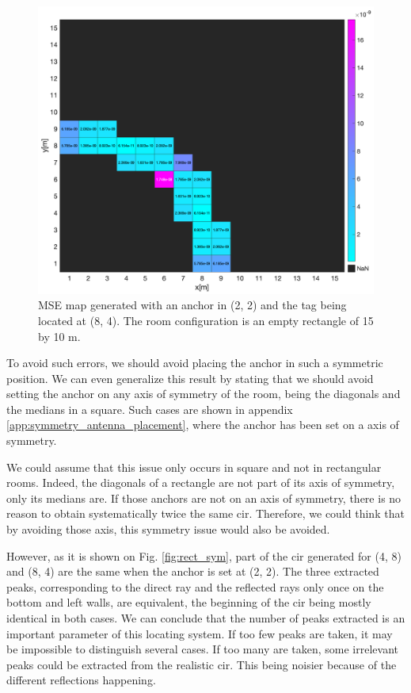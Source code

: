 \begin{figure}[H]
\centering
\includegraphics[width=.7\linewidth]{Images/square_sym_mse_4_8.png}
\caption{MSE map generated with an anchor in (2, 2) and the tag being located at (8, 4). The room configuration is an empty rectangle of 15 by 10 m.  \label{fig:square_sym_cir_comparison}}
\end{figure} 

To avoid such errors, we should avoid placing the anchor in such a symmetric position. We can even generalize this result by stating that we should avoid setting the anchor on any axis of symmetry of the room, being the diagonals and the medians in a square. Such cases are shown in appendix \ref{app:symmetry_antenna_placement}, where the anchor has been set on a axis of symmetry.
\vspace{2mm}

We could assume that this issue only occurs in square and not in rectangular rooms. Indeed, the diagonals of a rectangle are not part of its axis of symmetry, only its medians are. If those anchors are not on an axis of symmetry, there is no reason to obtain systematically twice the same \gls{cir}. Therefore, we could think that by avoiding those axis, this symmetry issue would also be avoided.
\vspace{2mm}

However, as it is shown on Fig. \ref{fig:rect_sym}, part of the \gls{cir} generated for (4, 8) and (8, 4) are the same when the anchor is set at (2, 2). The three extracted peaks, corresponding to the direct ray and the reflected rays only once on the bottom and left walls, are equivalent, the beginning of the \gls{cir} being mostly identical in both cases. We can conclude that the number of peaks extracted is an important parameter of this locating system. If too few peaks are taken, it may be impossible to distinguish several cases. If too many are taken, some irrelevant peaks could be extracted from the realistic \gls{cir}. This being noisier because of the different reflections happening.

